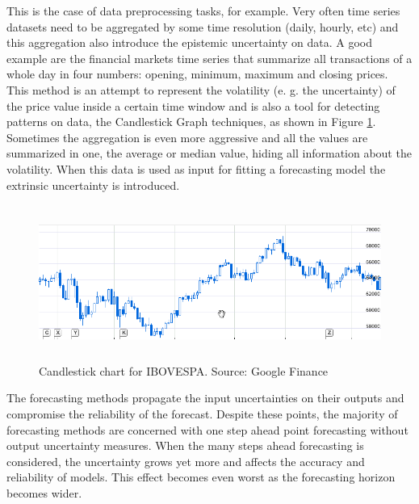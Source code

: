 This is the case of data preprocessing tasks, for example. Very often time series datasets need to be aggregated by some time resolution (daily, hourly, etc) and this aggregation also introduce the epistemic uncertainty on data. A good example are the financial markets time series that summarize all transactions of a whole day in four numbers: opening, minimum, maximum and closing prices. This method is an attempt to represent the volatility (e. g. the uncertainty) of the price value inside a certain time window and is also a tool for detecting patterns on data, the Candlestick Graph techniques, as shown in Figure \ref{fig:candlestick}. Sometimes the aggregation is even more aggressive and all the values are summarized in one, the average or median value, hiding all information about the volatility. When this data is used as input for fitting a forecasting model the extrinsic uncertainty is introduced.

\begin{figure}
\includegraphics[width=\textwidth,height=2in]{figures/candlestick.png}
\caption[Candlestick chart for IBOVESPA]%
{Candlestick chart for IBOVESPA. Source: Google Finance\protect\footnotemark}
\label{fig:candlestick}
\end{figure}


The forecasting methods propagate the input uncertainties on their outputs and compromise the reliability of the forecast. Despite these points, the majority of forecasting methods are concerned with one step ahead point forecasting without output uncertainty measures. When the many steps ahead forecasting is considered, the uncertainty grows yet more and affects the accuracy and reliability of models. This effect becomes even worst  as the forecasting horizon becomes wider.

